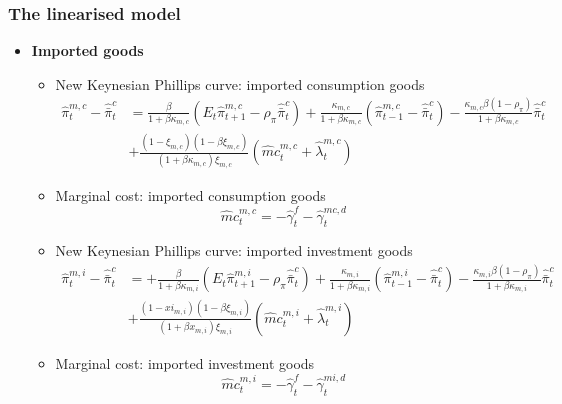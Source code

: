 \documentclass[9pt]{beamer}
\begin{document}
\begin{frame}[noframenumbering]
\frametitle{The linearised model}
\label{DomUnit2}
\begin{itemize}
    \item \textbf{Imported goods}
    \begin{itemize}
        \item New Keynesian Phillips curve: imported consumption goods
    $$
    \begin{aligned}
    \hat{\pi}_{t}^{m, c}-\hat{\bar{\pi}}_{t}^{c} &=\frac{\beta}{1+\beta \kappa_{m, c}}\left(E_{t} \hat{\pi}_{t+1}^{m, c}-\rho_{\pi} \hat{\bar{\pi}}_{t}^{c}\right)+\frac{\kappa_{m, c}}{1+\beta \kappa_{m, c}}\left(\hat{\pi}_{t-1}^{m, c}-\hat{\bar{\pi}}_{t}^{c}\right)-\frac{\kappa_{m, c} \beta\left(1-\rho_{\pi}\right)}{1+\beta \kappa_{m, c}} \hat{\bar{\pi}}_{t}^{c} \\
    &+\frac{\left(1-\xi_{m, c}\right)\left(1-\beta \xi_{m, c}\right)}{\left(1+\beta \kappa_{m, c}\right) \xi_{m, c}}\left(\hat{m} c_{t}^{m, c}+\hat{\lambda}_{t}^{m, c}\right)
    \end{aligned}
    $$
    
    \item Marginal cost: imported consumption goods
    $$
    \hat{m} c_{t}^{m, c}=-\hat{\gamma}_{t}^{f}-\hat{\gamma}_{t}^{m c, d}
    $$

    \item New Keynesian Phillips curve: imported investment goods
    $$
    \begin{aligned}
    \hat{\pi}_{t}^{m, i}-\hat{\bar{\pi}}_{t}^{c} &=+\frac{\beta}{1+\beta \kappa_{m, i}}\left(E_{t} \hat{\pi}_{t+1}^{m, i}-\rho_{\pi} \hat{\bar{\pi}}_{t}^{c}\right)+\frac{\kappa_{m, i}}{1+\beta \kappa_{m, i}}\left(\hat{\pi}_{t-1}^{m, i}-\hat{\bar{\pi}}_{t}^{c}\right)-\frac{\kappa_{m, i} \beta\left(1-\rho_{\pi}\right)}{1+\beta \kappa_{m, i}} \hat{\bar{\pi}}_{t}^{c} \\
    &+\frac{\left(1-xi_{m, i}\right)\left(1-\beta \xi_{m, i}\right)}{\left(1+\beta x_{m, i}\right) \xi_{m, i}}\left(\hat{m} c_{t}^{m, i}+\hat{\lambda}_{t}^{m, i}\right)
    \end{aligned}
    $$

    \item Marginal cost: imported investment goods
    $$
    \hat{m} c_{t}^{m, i}=-\hat{\gamma}_{t}^{f}-\hat{\gamma}_{t}^{m i, d}
    $$

    
    \end{itemize}
    
    
\end{itemize}

    \hyperlink{frame2}{}


\end{frame}
\end{document}
